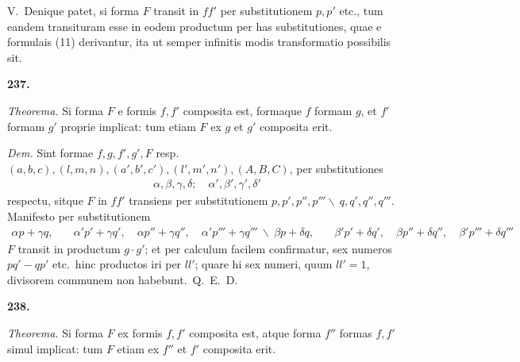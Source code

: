 \documentclass[12pt,a4paper]{article}
\theoremstyle{plain}
\theoremstyle{definition}
\theoremstyle{remark}
\begin{document}
V.\ Denique patet, si forma $F$ transit in $ff'$ per substitutionem $p, p'$ etc., tum eandem transituram esse in eodem productum per has substitutiones, quae e formulais (11) derivantur, ita ut semper infinitis modis transformatio possibilis sit.



\newpage
\begin{center}\textbf{237.}\end{center}

\textit{Theorema.} Si forma $F$ e formis $f, f'$ composita est, formaque $f$ formam $g$, et $f'$ formam $g'$ proprie implicat: tum etiam $F$ ex $g$ et $g'$ composita erit.

\textit{Dem.} Sint formae $f, g, f', g', F$ resp.\ $(a,b,c), (l,m,n), (a',b',c'), (l',m',n'), (A,B,C)$, per substitutiones
\begin{align*}
\alpha, \beta, \gamma, \delta; \quad \alpha', \beta', \gamma', \delta'
\end{align*}
respectu, sitque $F$ in $ff'$ transiens per substitutionem $p, p', p'', p''' \backslash\ q, q', q'', q'''$. Manifesto per substitutionem
\begin{align*}
\alpha p + \gamma q, &\quad \alpha'p' + \gamma q', \quad \alpha p'' + \gamma q'', \quad \alpha' p''' + \gamma q''' \ \backslash\ 
\beta p + \delta q, &\quad \beta' p' + \delta q', \quad \beta p'' + \delta q'', \quad \beta' p''' + \delta q'''
\end{align*}
$F$ transit in productum $g \cdot g'$; et per calculum facilem confirmatur, sex numeros $pq' - qp'$ etc.\ hinc productos iri per $ll'$; quare hi sex numeri, quum $ll' = 1$, divisorem communem non habebunt.\ Q.\ E.\ D.

\begin{center}\textbf{238.}\end{center}

\textit{Theorema.} Si forma $F$ ex formis $f, f'$ composita est, atque forma $f''$ formas $f, f'$ simul implicat: tum $F$ etiam ex $f''$ et $f'$ composita erit.
\end{document}
